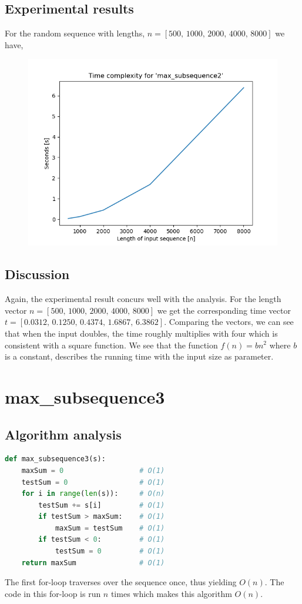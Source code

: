 \documentclass[12pt]{article}
\begin{document}
\subsection{Experimental results}
For the random sequence with lengths,
$n = [500,\,1000,\, 2000,\, 4000,\, 8000]$ we have,
\begin{figure}[h]
\centering
\includegraphics[scale=0.52]{ms2.png}
\end{figure}
\subsection{Discussion}
Again, the experimental result concurs well with the analysis. For the length vector $n = [500,\,1000,\, 2000,\, 4000,\, 8000]$ we get the corresponding time vector $ t = [0.0312,\,0.1250,\, 0.4374,\, 1.6867,\, 6.3862]$. Comparing the vectors, we can see that when the input doubles, the time roughly multiplies with four which is consistent with a square function.  We see that the function $f(n) = bn^2$ where $b$ is a constant, describes the running time with the input size as parameter.

\newpage
\section{max\_subsequence3}
\subsection{Algorithm analysis}
\begin{lstlisting}[language=Python]
def max_subsequence3(s):
    maxSum = 0                  # O(1)
    testSum = 0                 # O(1)
    for i in range(len(s)):     # O(n)
        testSum += s[i]         # O(1)
        if testSum > maxSum:    # O(1)
            maxSum = testSum    # O(1)
        if testSum < 0:         # O(1)
            testSum = 0         # O(1)
    return maxSum               # O(1)
\end{lstlisting}
The first for-loop traverses over the sequence once, thus yielding $O(n)$. The code in this for-loop is run $n$ times which makes this algorithm $O(n)$.
\end{document}
